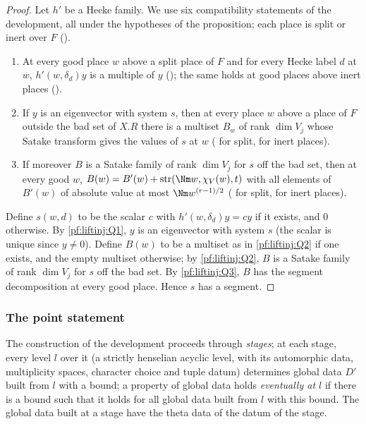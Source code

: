 \begin{proof}
Let $h'$ be a Hecke family. We use six compatibility statements of the development, all under the hypotheses of the proposition; each place is split or
inert over $F$ ().
\begin{enumerate}[label=(Q\arabic*)]
\item\label{pf:liftinj:Q1} At every good place $w$ above a split place of $F$ and for every Hecke label $d$ at $w$, $h'(w,\delta_d)y$ is a multiple of $y$
(); the same holds at good places above inert places
().
\item\label{pf:liftinj:Q2} If $y$ is an eigenvector with system $s$, then at every place $w$ above a place of $F$ outside the bad set of $X.R$ there is a
multiset $B_w$ of rank $\dim V_j$ whose Satake transform gives the values of $s$ at $w$
( for split,  for inert
places).
\item\label{pf:liftinj:Q3} If moreover $B$ is a Satake family of rank $\dim V_j$ for $s$ off the bad set, then at every good $w$,
$B(w)=B'(w)+\liftinjstr(\Nm w,\chi_V(w),t)$ with all elements of $B'(w)$ of absolute value at most $\Nm w^{(r-1)/2}$
( for split,  for inert places).
\end{enumerate}
Define $s(w,d)$ to be the scalar $c$ with $h'(w,\delta_d)y=cy$ if it exists, and $0$ otherwise. By \ref{pf:liftinj:Q1}, $y$ is an eigenvector with system
$s$ (the scalar is unique since $y\ne0$). Define $B(w)$ to be a multiset as in \ref{pf:liftinj:Q2} if one exists, and the empty multiset otherwise; by
\ref{pf:liftinj:Q2}, $B$ is a Satake family of rank $\dim V_j$ for $s$ off the bad set. By \ref{pf:liftinj:Q3}, $B$ has the segment decomposition at every good
place. Hence $s$ has a segment.
\end{proof}

\subsubsection{The point statement}\label{sec:pf:liftinj:ptstsec}

The construction of the development proceeds through \emph{stages}; at each stage, every level $l$ over it (a strictly henselian acyclic level, with its
automorphic data, multiplicity spaces, character choice and tuple datum) determines global data $D'$ built from $l$ with a bound; a property of global data
holds \emph{eventually at $l$} if there is a bound such that it holds for all global data built from $l$ with this bound. The global data built at a stage
have the theta data of the datum of the stage.


